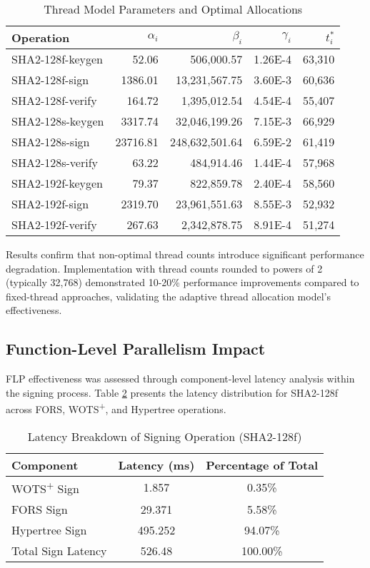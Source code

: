 \documentclass[journal]{IEEEtran}
\begin{document}
\begin{table}[h]
  \centering
  \caption{Thread Model Parameters and Optimal Allocations}
  \label{tab:thread_model_params}
  \begin{tabular}{@{}lrrrr@{}}
    \toprule
    \textbf{Operation} & \boldmath$\alpha_i$ & \boldmath$\beta_i$ & \boldmath$\gamma_i$ & \boldmath$t_i^*$ \\
    \midrule
    SHA2-128f-keygen & 52.06 & 506,000.57 & 1.26E-4 & 63,310 \\
    SHA2-128f-sign & 1386.01 & 13,231,567.75 & 3.60E-3 & 60,636 \\
    SHA2-128f-verify & 164.72 & 1,395,012.54 & 4.54E-4 & 55,407 \\
    SHA2-128s-keygen & 3317.74 & 32,046,199.26 & 7.15E-3 & 66,929 \\
    SHA2-128s-sign & 23716.81 & 248,632,501.64 & 6.59E-2 & 61,419 \\
    SHA2-128s-verify & 63.22 & 484,914.46 & 1.44E-4 & 57,968 \\
    SHA2-192f-keygen & 79.37 & 822,859.78 & 2.40E-4 & 58,560 \\
    SHA2-192f-sign & 2319.70 & 23,961,551.63 & 8.55E-3 & 52,932 \\
    SHA2-192f-verify & 267.63 & 2,342,878.75 & 8.91E-4 & 51,274 \\
    \bottomrule
  \end{tabular}
\end{table}

Results confirm that non-optimal thread counts introduce significant performance degradation. Implementation with thread counts rounded to powers of 2 (typically 32,768) demonstrated 10-20\% performance improvements compared to fixed-thread approaches, validating the adaptive thread allocation model's effectiveness.

\subsection{Function-Level Parallelism Impact}

FLP effectiveness was assessed through component-level latency analysis within the signing process. Table \ref{tab:flp_impact} presents the latency distribution for SHA2-128f across FORS, WOTS\textsuperscript{+}, and Hypertree operations.

\begin{table}[h]
  \centering
  \caption{Latency Breakdown of Signing Operation (SHA2-128f)}
  \label{tab:flp_impact}
  \begin{tabular}{@{}lcc@{}}
    \toprule
    \textbf{Component} & \textbf{Latency (ms)} & \textbf{Percentage of Total} \\
    \midrule
    WOTS\textsuperscript{+} Sign & 1.857 & 0.35\% \\
    FORS Sign & 29.371 & 5.58\% \\
    Hypertree Sign & 495.252 & 94.07\% \\
    \midrule
    Total Sign Latency & 526.48 & 100.00\% \\
    \bottomrule
  \end{tabular}
\end{table}
\end{document}
